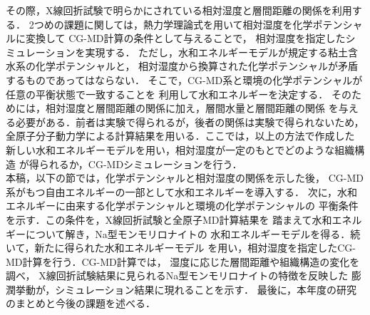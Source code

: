その際，X線回折試験で明らかにされている相対湿度と層間距離の関係を利用する．
2つめの課題に関しては，熱力学理論式を用いて相対湿度を化学ポテンシャルに変換して
CG-MD計算の条件として与えることで，
相対湿度を指定したシミュレーションを実現する．
ただし，水和エネルギーモデルが規定する粘土含水系の化学ポテンシャルと，
相対湿度から換算された化学ポテンシャルが矛盾するものであってはならない．
そこで，CG-MD系と環境の化学ポテンシャルが任意の平衡状態で一致することを
利用して水和エネルギーを決定する．
そのためには，相対湿度と層間距離の関係に加え，層間水量と層間距離の関係
を与える必要がある．前者は実験で得られるが，後者の関係は実験で得られないため，
全原子分子動力学による計算結果を用いる．ここでは，以上の方法で作成した
新しい水和エネルギーモデルを用い，相対湿度が一定のもとでどのような組織構造
が得られるか，CG-MDシミュレーションを行う．\\
\hspace{\parindent}
本稿，以下の節では，化学ポテンシャルと相対湿度の関係を示した後，
CG-MD系がもつ自由エネルギーの一部として水和エネルギーを導入する．
次に，水和エネルギーに由来する化学ポテンシャルと環境の化学ポテンシャルの
平衡条件を示す．この条件を，X線回折試験と全原子MD計算結果を
踏まえて水和エネルギーについて解き，Na型モンモリロナイトの
水和エネルギーモデルを得る．続いて，新たに得られた水和エネルギーモデル
を用い，相対湿度を指定したCG-MD計算を行う．CG-MD計算では，
湿度に応じた層間距離や組織構造の変化を調べ，
X線回折試験結果に見られるNa型モンモリロナイトの特徴を反映した
膨潤挙動が，シミュレーション結果に現れることを示す．
最後に，本年度の研究のまとめと今後の課題を述べる．
